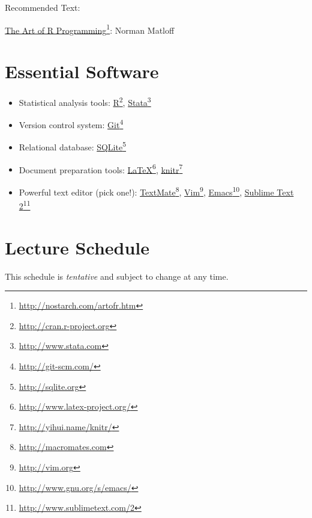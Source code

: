 \documentclass[11pt,oneside]{article}
\begin{document}
Recommended Text:

\href{http://nostarch.com/artofr.htm}{The Art of R Programming}\footnote{\href{http://nostarch.com/artofr.htm}{http://nostarch.com/artofr.htm}}: Norman Matloff

\section{Essential Software}
\label{essentialsoftware}

\begin{itemize}

\item Statistical analysis tools: \href{http://cran.r-project.org}{R}\footnote{\href{http://cran.r-project.org}{http://cran.r-project.org}}, \href{http://www.stata.com}{Stata}\footnote{\href{http://www.stata.com}{http://www.stata.com}}
\item Version control system: \href{http://git-scm.com/}{Git}\footnote{\href{http://git-scm.com/}{http://git-scm.com/}}
\item Relational database: \href{http://sqlite.org}{SQLite}\footnote{\href{http://sqlite.org}{http://sqlite.org}}
\item Document preparation tools: \href{http://www.latex-project.org/}{LaTeX}\footnote{\href{http://www.latex-project.org/}{http://www.latex-project.org/}}, \href{http://yihui.name/knitr/}{knitr}\footnote{\href{http://yihui.name/knitr/}{http://yihui.name/knitr/}}
\item Powerful text editor (pick one!): \href{http://macromates.com}{TextMate}\footnote{\href{http://macromates.com}{http://macromates.com}}, \href{http://vim.org}{Vim}\footnote{\href{http://vim.org}{http://vim.org}}, \href{http://www.gnu.org/s/emacs/}{Emacs}\footnote{\href{http://www.gnu.org/s/emacs/}{http://www.gnu.org/s/emacs/}}, \href{http://www.sublimetext.com/2}{Sublime Text 2}\footnote{\href{http://www.sublimetext.com/2}{http://www.sublimetext.com/2}}
\end{itemize}

\section{Lecture Schedule}
\label{lectureschedule}

This schedule is {\itshape tentative} and subject to change at any time.
\end{document}
